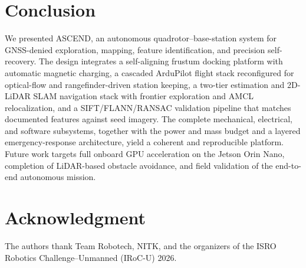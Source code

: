 \documentclass[journal]{IEEEtran}
\begin{document}
\section{Conclusion}
\label{sec:concl}
We presented ASCEND, an autonomous quadrotor--base-station system for
GNSS-denied exploration, mapping, feature identification, and precision
self-recovery. The design integrates a self-aligning frustum docking
platform with automatic magnetic charging, a cascaded ArduPilot flight stack
reconfigured for optical-flow and rangefinder-driven station keeping, a
two-tier estimation and 2D-LiDAR SLAM navigation stack with frontier
exploration and AMCL relocalization, and a SIFT/FLANN/RANSAC validation
pipeline that matches documented features against seed imagery. The complete
mechanical, electrical, and software subsystems, together with the power and
mass budget and a layered emergency-response architecture, yield a coherent
and reproducible platform. Future work targets full onboard GPU acceleration
on the Jetson Orin Nano, completion of LiDAR-based obstacle avoidance, and
field validation of the end-to-end autonomous mission.

\section*{Acknowledgment}
The authors thank Team Robotech, NITK, and the organizers of the ISRO
Robotics Challenge--Unmanned (IRoC-U) 2026.



\end{document}
